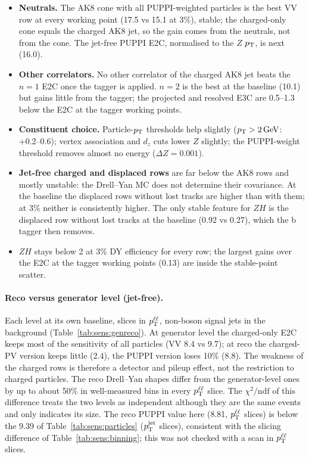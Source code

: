 \begin{itemize}
\item \textbf{Neutrals.} The AK8 cone with all PUPPI-weighted particles is the best VV row at every working point
  (17.5 vs 15.1 at 3\%), stable; the charged-only cone equals the charged AK8 jet, so the gain comes from the neutrals,
  not from the cone. The jet-free PUPPI E2C, normalised to the $Z$ $p_{\mathrm{T}}$, is next (16.0).
\item \textbf{Other correlators.} No other correlator of the charged AK8 jet beats the $n = 1$ E2C once the tagger is
  applied. $n = 2$ is the best at the baseline (10.1) but gains little from the tagger; the projected and resolved E3C
  are 0.5--1.3 below the E2C at the tagger working points.
\item \textbf{Constituent choice.} Particle-$p_{\mathrm{T}}$ thresholds help slightly ($p_{\mathrm{T}} > 2\,\mathrm{GeV}$: +0.2--0.6); vertex association
  and $d_z$ cuts lower $Z$ slightly; the PUPPI-weight threshold removes almost no energy ($\Delta Z = 0.001$).
\item \textbf{Jet-free charged and displaced rows} are far below the AK8 rows and mostly unstable: the Drell--Yan MC
  does not determine their covariance. At the baseline the displaced rows without lost tracks are higher than with
  them; at 3\% neither is consistently higher. The only stable feature for $ZH$ is the displaced row without lost tracks
  at the baseline (0.92 vs 0.27), which the b tagger then removes.
\item \textbf{$ZH$} stays below 2 at 3\% DY efficiency for every row; the largest gains over the E2C at the tagger
  working points (0.13) are inside the stable-point scatter.
\end{itemize}

\paragraph{Reco versus generator level (jet-free).} Each level at its own baseline, slices in $p_{\mathrm{T}}^{\ell\ell}$, non-boson signal
jets in the background (Table~\ref{tab:sens:genreco}). At generator level the charged-only E2C keeps most of the
sensitivity of all particles (VV 8.4 vs 9.7); at reco the charged-PV version keeps little (2.4), the PUPPI version
loses 10\% (8.8). The weakness of the charged rows is therefore a detector and pileup effect, not the restriction to
charged particles. The reco Drell--Yan shapes differ from the generator-level ones by up to about 50\% in well-measured
bins in every $p_{\mathrm{T}}^{\ell\ell}$ slice. The $\chi^2/\mathrm{ndf}$ of this difference treats the two levels as independent although
they are the same events and only indicates its size. The reco PUPPI value here (8.81, $p_{\mathrm{T}}^{\ell\ell}$ slices) is below the
9.39 of Table~\ref{tab:sens:particles} ($p_{\mathrm{T}}^{\mathrm{jet}}$ slices), consistent with the slicing difference of
Table~\ref{tab:sens:binning}; this was not checked with a scan in $p_{\mathrm{T}}^{\ell\ell}$ slices.

